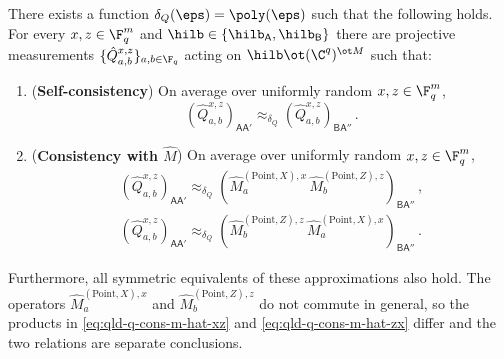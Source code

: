 \begin{lemma}
	\label{lem:qld-4-10}
	\leanok
	There exists a function $\delta_Q(\eps) = \poly(\eps)$ such that the
	following holds. For every $x, z \in \F_q^m$ and
	$\hilb \in \{\hilb_{\mathsf{A}}, \hilb_{\mathsf{B}}\}$ there are
	projective measurements $\{\hat{Q}^{x,z}_{a,b}\}_{a,b \in \F_q}$ acting
	on $\hilb \ot (\C^q)^{\ot M}$ such that:
	\begin{enumerate}
		\item (\textbf{Self-consistency}) On average over uniformly random
		$x, z \in \F_q^m$,
		\begin{equation}
			\label{eq:qld-q-self-cons}
			(\hat{Q}^{x,z}_{a,b})_{\mathsf{A}\mathsf{A}'}
			\approx_{\delta_Q}
			(\hat{Q}^{x,z}_{a,b})_{\mathsf{B}\mathsf{A}''}\,.
		\end{equation}
		\item (\textbf{Consistency with $\hat{M}$}) On average over uniformly
		random $x, z \in \F_q^m$,
		\begin{gather}
			\label{eq:qld-q-cons-m-hat-xz}
			(\hat{Q}^{x,z}_{a,b})_{\mathsf{A}\mathsf{A}'}
			\approx_{\delta_Q}
			(\hat{M}^{(\mathrm{Point},X),x}_{a} \,
			\hat{M}^{(\mathrm{Point},Z),z}_{b})_{\mathsf{B}\mathsf{A}''}\,,
			\\
			\label{eq:qld-q-cons-m-hat-zx}
			(\hat{Q}^{x,z}_{a,b})_{\mathsf{A}\mathsf{A}'}
			\approx_{\delta_Q}
			(\hat{M}^{(\mathrm{Point},Z),z}_{b} \,
			\hat{M}^{(\mathrm{Point},X),x}_{a})_{\mathsf{B}\mathsf{A}''}\,.
		\end{gather}
	\end{enumerate}
	Furthermore, all symmetric equivalents of these approximations also hold.
	The operators $\hat{M}^{(\mathrm{Point},X),x}_{a}$ and
	$\hat{M}^{(\mathrm{Point},Z),z}_{b}$ do not commute in general, so the
	products in \eqref{eq:qld-q-cons-m-hat-xz} and
	\eqref{eq:qld-q-cons-m-hat-zx} differ and the two relations are separate
	conclusions.
\end{lemma}
